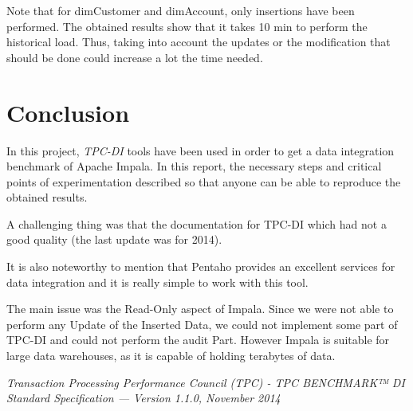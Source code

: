 \documentclass{article}
\newcommand\ita[1]{\textit{#1}}
\begin{document}
Note that for dimCustomer and dimAccount, only insertions have been performed. The obtained results show that it takes 10 min to perform the historical load. Thus, taking into account the updates or the modification that should be done could increase a lot the time needed.

\section{Conclusion}
In this project, \ita{TPC-DI} tools have been used in order to get a data integration benchmark of Apache Impala. In this report, the necessary steps and critical points of experimentation described so that anyone can be able to reproduce the obtained results.

A challenging thing was that the documentation for TPC-DI which had not a good quality (the last update was for 2014).

It is also noteworthy to mention that Pentaho provides an excellent services for data integration and it is really simple to work with this tool.

The main issue was the Read-Only aspect of Impala. Since we were not able to perform any Update of the Inserted Data, we could not implement some part of TPC-DI and could not perform the audit Part. However Impala is suitable for large data warehouses, as it is capable of holding terabytes of data.

\begin{thebibliography}{99}
     \emph{Transaction Processing Performance Council (TPC) - TPC BENCHMARK™ DI Standard Specification — Version 1.1.0, November 2014}
    
\end{thebibliography}
\end{document}
